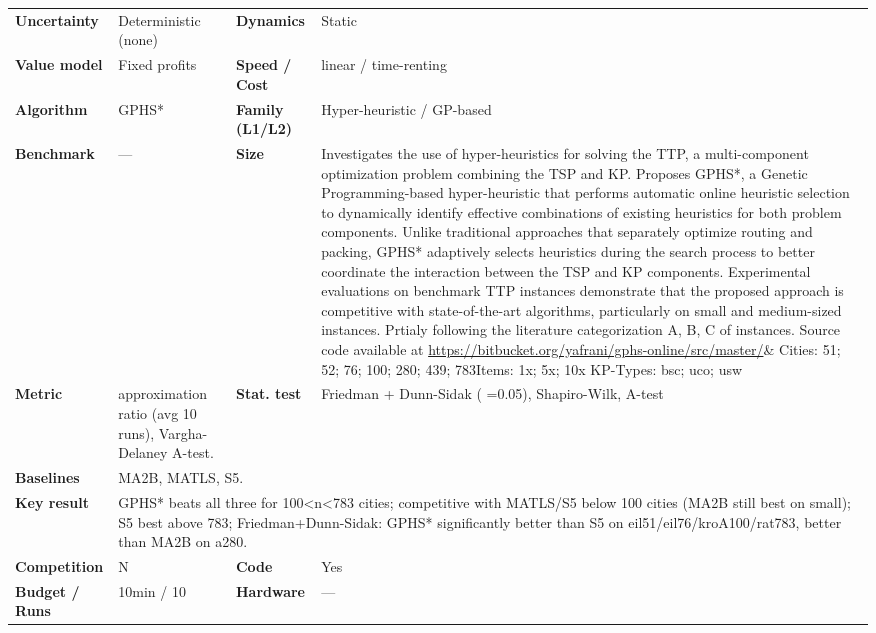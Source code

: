 \documentclass[
  a4paper,
  11pt,
  headings=small,
  numbers=noenddot,
  abstract=on,
  parskip=half,
]{scrartcl}
\begin{document}
\begin{landscape}
\begin{longtable}{@{}p{2.6cm}p{8.7cm}p{2.6cm}p{8.7cm}@{}}
\textbf{Uncertainty} & Deterministic (none) & \textbf{Dynamics} & Static \\
\textbf{Value model} & Fixed profits & \textbf{Speed / Cost} & linear / time-renting \\
\textbf{Algorithm} & GPHS* & \textbf{Family (L1/L2)} & Hyper-heuristic / GP-based \\
\textbf{Benchmark} & --- & \textbf{Size} & Investigates the use of hyper-heuristics for solving the TTP, a multi-component optimization problem combining the TSP and KP. Proposes GPHS*, a Genetic Programming-based hyper-heuristic that performs automatic online heuristic selection to dynamically identify effective combinations of existing heuristics for both problem components.
Unlike traditional approaches that separately optimize routing and packing, GPHS* adaptively selects heuristics during the search process to better coordinate the interaction between the TSP and KP components. Experimental evaluations on benchmark TTP instances demonstrate that the proposed approach is competitive with state-of-the-art algorithms, particularly on small and medium-sized instances. Prtialy following the literature categorization A, B, C of instances. Source code available at \url{https://bitbucket.org/yafrani/gphs-online/src/master/}\& Cities: 51; 52; 76; 100; 280; 439; 783\newline Items: 1x; 5x; 10x \newline KP-Types: bsc; uco; usw \\
\textbf{Metric} & approximation ratio (avg 10 runs), Vargha-Delaney A-test. & \textbf{Stat. test} & Friedman + Dunn-Sidak ( =0.05), Shapiro-Wilk, A-test \\
\textbf{Baselines} & \multicolumn{3}{p{20.0cm}}{MA2B, MATLS, S5.} \\
\textbf{Key result} & \multicolumn{3}{p{20.0cm}}{GPHS* beats all three for 100<n<783 cities; competitive with MATLS/S5 below 100 cities (MA2B still best on small); S5 best above 783; Friedman+Dunn-Sidak: GPHS* significantly better than S5 on eil51/eil76/kroA100/rat783, better than MA2B on a280.} \\
\textbf{Competition} & N & \textbf{Code} & Yes \\
\textbf{Budget / Runs} & 10min / 10 & \textbf{Hardware} & --- \\

\end{longtable}
\end{landscape}
\end{document}
